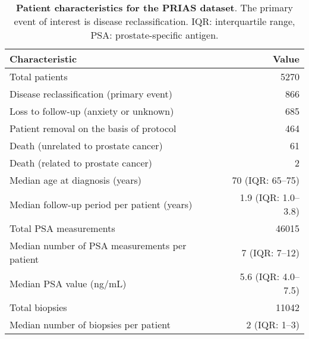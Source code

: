 \begin{table}
\small\sf\centering
\caption{\textbf{Patient characteristics for the PRIAS dataset}. The primary event of interest is disease reclassification. IQR: interquartile range, PSA: prostate-specific antigen.}
\label{table:prias_summary}
\begin{tabular}{lr}
\hline
\hline
Characteristic & Value\\
\hline
Total patients & 5270\\
Disease reclassification (primary event) & 866\\
Loss to follow-up (anxiety or unknown) & 685\\
Patient removal on the basis of protocol & 464\\
Death (unrelated to prostate cancer) & 61\\
Death (related to prostate cancer) & 2\\
\hline
Median age at diagnosis (years) & 70 (IQR: 65--75)\\
Median follow-up period per patient (years) &  1.9 (IQR: 1.0--3.8)\\
Total PSA measurements & 46015\\
Median number of PSA measurements per patient &  7 (IQR: 7--12)\\
Median PSA value (ng/mL) & 5.6 (IQR: 4.0--7.5)\\
Total biopsies & 11042\\
Median number of biopsies per patient &  2 (IQR: 1--3)\\
\hline
\end{tabular}
\end{table}